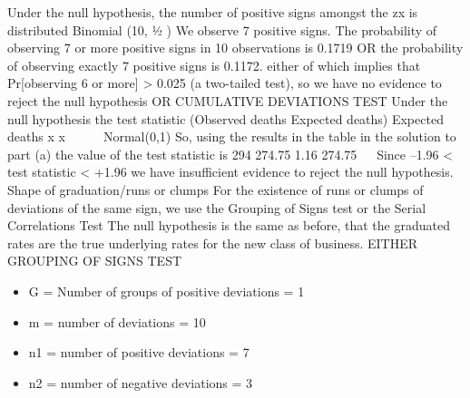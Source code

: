 \documentclass[a4paper,12pt]{article}
\begin{document}
Under the null hypothesis, the number of positive signs amongst the zx is
distributed Binomial (10, ½ )
We observe 7 positive signs.
The probability of observing 7 or more positive signs in 10 observations is
0.1719
OR
the probability of observing exactly 7 positive signs is 0.1172.
either of which implies that Pr[observing 6 or more] > 0.025 (a two-tailed
test),
so we have no evidence to reject the null hypothesis
OR CUMULATIVE DEVIATIONS TEST
Under the null hypothesis
the test statistic
(Observed deaths Expected deaths)
Expected deaths
x
x
 

~ Normal(0,1)
So, using the results in the table in the solution to part (a) the value of the test
statistic is
294 274.75 1.16
274.75


Since –1.96 < test statistic < +1.96
we have insufficient evidence to reject the null hypothesis.
Shape of graduation/runs or clumps
For the existence of runs or clumps of deviations of the same sign, we use the
Grouping of Signs test or the Serial Correlations Test
The null hypothesis is the same as before, that the graduated rates are the true
underlying rates for the new class of business.
EITHER GROUPING OF SIGNS TEST
\begin{itemize}
    \item G = Number of groups of positive deviations = 1
    \item m = number of deviations = 10
    \item n1 = number of positive deviations = 7
    \item n2 = number of negative deviations = 3
\end{itemize}
\end{document}
